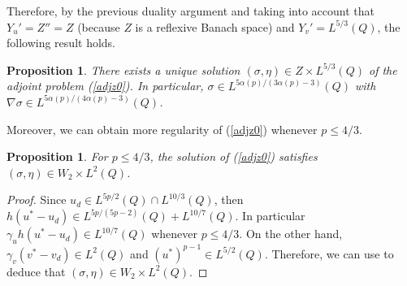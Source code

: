 \documentclass[11pt,reqno]{amsart}%
\newtheorem{proposition}[theorem]{Proposition}
\numberwithin{equation}{section}
\begin{document}
{Therefore, by the previous duality argument and  taking into account that
 $Y_u'=Z''=Z$ (because $Z$ is a reflexive Banach space) and $Y_v'=L^{5/3}(Q)$,  %
  the following result holds.
 
\begin{proposition}
There exists a unique  solution   $(\sigma,\eta)\in Z \times L^{5/3}(Q)$ of the adjoint problem (\ref{adjz0}).
In particular, $\sigma\in L^{5\alpha(p)/(3\alpha(p)-3)}(Q)$ with $\nabla\sigma\in L^{5\alpha(p)/(4\alpha(p)-3)}(Q)$.
\end{proposition}

Moreover, we can obtain more regularity of  (\ref{adjz0}) whenever $p\le 4/3$.

\begin{proposition} \label{Reg-mult}
For $p\le 4/3$, the  solution of (\ref{adjz0})  satisfies $(\sigma, \eta)\in W_2 \times  L^2(Q)$. 
\end{proposition}
\begin{proof}
 Since $u_d\in L^{5p/2}(Q)\cap L^{10/3}(Q)$, then $h({u^*-u_d})\in L^{5p/(5p-2)}(Q) + L^{10/7}(Q)$. In particular $\gamma_u h({u^*-u_d})\in L^{10/7}(Q)$ whenever $p\le 4/3$. On the other hand,  
$\gamma_v({v^*}-v_d)\in L^2(Q)$ and $(u^*)^{p-1}\in L^{5/2}(Q)$. Therefore, we can use  \cite[Theorem A.1, case 2b)]{Andre_SICOM} to deduce that $({\sigma},{\eta})\in W_2 \times  L^2(Q) $.
\end{proof}

}
\end{document}
